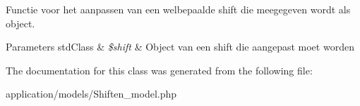 Functie voor het aanpassen van een welbepaalde shift die meegegeven wordt als object. 
\begin{DoxyParams}[1]{Parameters}
std\+Class & {\em \$shift} & Object van een shift die aangepast moet worden \\
\hline
\end{DoxyParams}


The documentation for this class was generated from the following file\+:\begin{DoxyCompactItemize}
\item 
application/models/Shiften\+\_\+model.\+php\end{DoxyCompactItemize}
